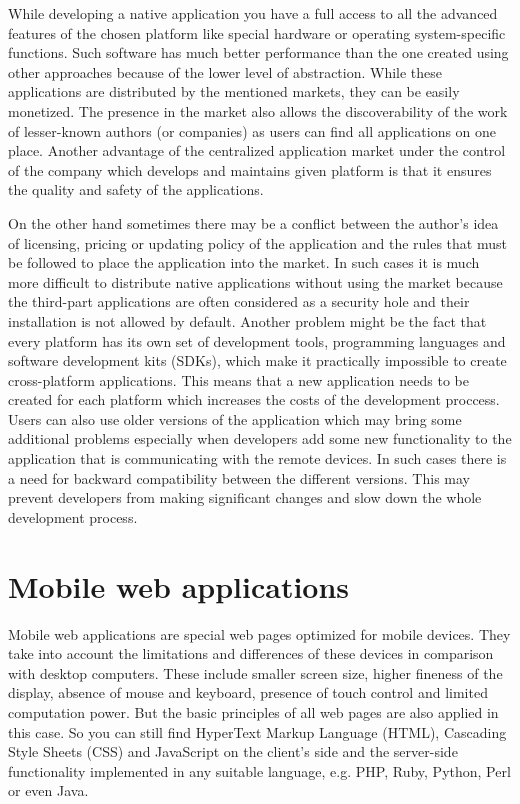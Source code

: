 \documentclass[12pt,oneside,final]{fithesis2}
\begin{document}
While developing a native application you have a full access to all the advanced features of the chosen platform like special hardware or operating system-specific functions.
Such software has much better performance than the one created using other approaches because of the lower level of abstraction.
While these applications are distributed by the mentioned markets, they can be easily monetized.
The presence in the market also allows the discoverability of the work of lesser-known authors (or companies) as users can find all applications on one place.
Another advantage of the centralized application market under the control of the company which develops and maintains given platform is that it ensures the quality and safety of the applications.

On the other hand sometimes there may be a conflict between the author's idea of licensing, pricing or updating policy of the application and the rules that must be followed to place the application into the market.
In such cases it is much more difficult to distribute native applications without using the market because the third-part applications are often considered as a security hole and their installation is not allowed by default.
Another problem might be the fact that every platform has its own set of development tools, programming languages and software development kits (SDKs), which make it practically impossible to create cross-platform applications.
This means that a new application needs to be created for each platform which increases the costs of the development proccess.
Users can also use older versions of the application which may bring some additional problems especially when developers add some new functionality to the application that is communicating with the remote devices.
In such cases there is a need for backward compatibility between the different versions.
This may prevent developers from making significant changes and slow down the whole development process.

\section{Mobile web applications}
Mobile web applications are special web pages optimized for mobile devices.
They take into account the limitations and differences of these devices in comparison with desktop computers.
These include smaller screen size, higher fineness of the display, absence of mouse and keyboard, presence of touch control and limited computation power.
But the basic principles of all web pages are also applied in this case.
So you can still find HyperText Markup Language (HTML), Cascading Style Sheets (CSS) and JavaScript on the client's side and the server-side functionality implemented in any suitable language, e.g. PHP, Ruby, Python, Perl or even Java.
\end{document}
